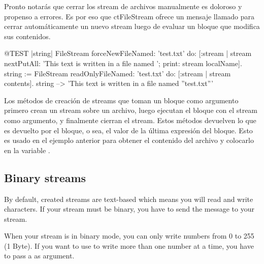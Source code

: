 \documentclass[a4paper,10pt,twoside]{book}
\begin{document}
{%
Pronto notar\'as que cerrar los stream de archivos manualmente es doloroso y propenso a errores. 
Es por eso que ct{FileStream} ofrece un mensaje llamado  
para cerrar autom\'aticamente un nuevo stream luego de evaluar un bloque que modifica sus contenidos. 

 
\begin{code}{@TEST |string|}
FileStream
    forceNewFileNamed: 'test.txt'
    do: [:stream |
        stream
            nextPutAll: 'This text is written in a file named ';
            print: stream localName].
string := FileStream
            readOnlyFileNamed: 'test.txt'
            do: [:stream | stream contents].
string --> 'This text is written in a file named ''test.txt'''
\end{code}

Los m\'etodos de creaci\'on de streams que toman un bloque como argumento
primero crean un stream sobre un archivo, luego ejecutan el bloque con 
el stream como argumento, y finalmente cierran el stream. Estos m\'etodos
devuelven lo que es devuelto por el bloque, o sea, el valor de la \'ultima
expresi\'on del bloque. Esto es usado en el ejemplo anterior para obtener
el contenido del archivo y colocarlo en la variable .

\subsection{Binary streams}

By default, created streams are text-based which means you will read
and write characters. If your stream must be binary, you have to send
the message  to your stream.

When your stream is in binary mode, you can only write numbers from 0
to 255 (1 Byte). If you want to use  to write more
than one number at a time, you have to pass a  as
argument.

}
\end{document}

